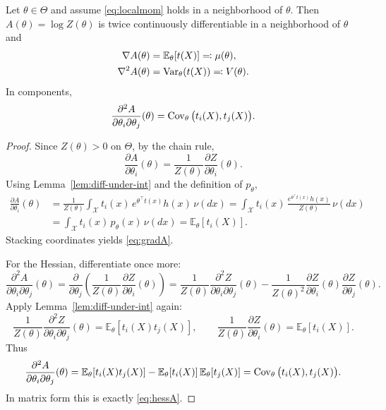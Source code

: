 \begin{prop}
\label{prop:grad-hess-A}
Let $\theta\in\Theta$ and assume \eqref{eq:localmom} holds in a neighborhood of $\theta$.
Then $A(\theta)=\log Z(\theta)$ is twice continuously differentiable in a neighborhood of $\theta$ and
\begin{align}
\nabla A(\theta) &= \mathbb E_\theta[t(X)] \eqqcolon \mu(\theta), \label{eq:gradA}\\
\nabla^2 A(\theta) &= \operatorname{Var}_\theta(t(X)) \eqqcolon V(\theta). \label{eq:hessA}
\end{align}
In components,
\[
\frac{\partial^2 A}{\partial\theta_i\partial\theta_j}(\theta)
=
\operatorname{Cov}_\theta\big(t_i(X),t_j(X)\big).
\]
\end{prop}

\begin{proof}
Since $Z(\theta)>0$ on $\Theta$, by the chain rule,
\[
\frac{\partial A}{\partial\theta_i}(\theta)
=
\frac{1}{Z(\theta)}\frac{\partial Z}{\partial\theta_i}(\theta).
\]
Using Lemma~\ref{lem:diff-under-int} and the definition of $p_\theta$,
\begin{align*}
\frac{\partial A}{\partial\theta_i}(\theta)
&=
\frac{1}{Z(\theta)}\int_{\mathcal X} t_i(x)\, e^{\theta^\top t(x)} h(x)\,\nu(dx)
=
\int_{\mathcal X} t_i(x)\, \frac{e^{\theta^\top t(x)} h(x)}{Z(\theta)}\,\nu(dx)
\\
&=
\int_{\mathcal X} t_i(x)\, p_\theta(x)\,\nu(dx)
=
\mathbb E_\theta[t_i(X)].
\end{align*}
Stacking coordinates yields \eqref{eq:gradA}.

For the Hessian, differentiate once more:
\[
\frac{\partial^2 A}{\partial\theta_i\partial\theta_j}(\theta)
=
\frac{\partial}{\partial\theta_j}\left(\frac{1}{Z(\theta)}\frac{\partial Z}{\partial\theta_i}(\theta)\right)
=
\frac{1}{Z(\theta)}\frac{\partial^2 Z}{\partial\theta_i\partial\theta_j}(\theta)
-\frac{1}{Z(\theta)^2}\frac{\partial Z}{\partial\theta_i}(\theta)\frac{\partial Z}{\partial\theta_j}(\theta).
\]
Apply Lemma~\ref{lem:diff-under-int} again:
\[
\frac{1}{Z(\theta)}\frac{\partial^2 Z}{\partial\theta_i\partial\theta_j}(\theta)
=
\mathbb E_\theta[t_i(X)t_j(X)],
\qquad
\frac{1}{Z(\theta)}\frac{\partial Z}{\partial\theta_i}(\theta)
=
\mathbb E_\theta[t_i(X)].
\]
Thus
\[
\frac{\partial^2 A}{\partial\theta_i\partial\theta_j}(\theta)
=
\mathbb E_\theta[t_i(X)t_j(X)]
-\mathbb E_\theta[t_i(X)]\,\mathbb E_\theta[t_j(X)]
=
\operatorname{Cov}_\theta\big(t_i(X),t_j(X)\big).
\]
In matrix form this is exactly \eqref{eq:hessA}.
\end{proof}

